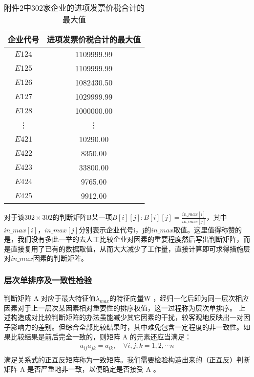 \documentclass{cumcmthesis}
\begin{document}
\begin{table}[H]
    
    \label{tablesymbol}
    \centering
    \begin{tabular}{|c|c|}   
    \hline
    企业代号 & 进项发票价税合计的最大值 \\
    \hline 
    $E124$  &  1109999.99\\
    $E125$  &  1109999.99\\
    $E126$  &  1082430.50\\
    $E127$  &  1029999.99\\
    $E128$  &  1000000.00\\
     \vdots &  \vdots \\  
    $E421$  &    10290.00\\
    $E422$  &     8350.00\\
    $E423$  &    33800.00\\
    $E424$  &     9765.00\\
    $E425$  &     9912.00\\
    \hline
    \end{tabular}
    \caption{附件2中302家企业的进项发票价税合计的最大值}
    \label{table2}
\end{table}

对于该$302 \times 302$的判断矩阵B某一项$B[i][j]: B[i][j] = \frac{in\_max[i]}{in\_max[j]}$，其中$in\_max[i]$，$in\_max[j]$分别表示企业代号i，j的$in\_max$取值。这里值得称赞的是，我们没有多此一举的去人工比较企业对因素的重要程度然后写出判断矩阵，而是直接复用了已有的数据取值，从而大大减少了工作量，直接计算即可求得措施层对$in\_max$因素的判断矩阵。

\subsubsection{层次单排序及一致性检验}
判断矩阵 A 对应于最大特征值$\lambda_{max}$的特征向量W ，经归一化后即为同一层次相应因素对于上一层次某因素相对重要性的排序权值，这一过程称为层次单排序。
上述构造成对比较判断矩阵的办法虽能减少其它因素的干扰，较客观地反映出一对因子影响力的差别。但综合全部比较结果时，其中难免包含一定程度的非一致性。如果比较结果是前后完全一致的，则矩阵 A 的元素还应当满足：
\begin{equation}
    \begin{split}
        a_{ij}a_{jk} = a_{ik},  \quad  \forall i,j,k = 1,2,\cdots n \\
    \end{split}
\end{equation}
满足关系式的正互反矩阵称为一致矩阵。我们需要检验构造出来的（正互反）判断矩阵 A 是否严重地非一致，以便确定是否接受 A 。 
\end{document}
